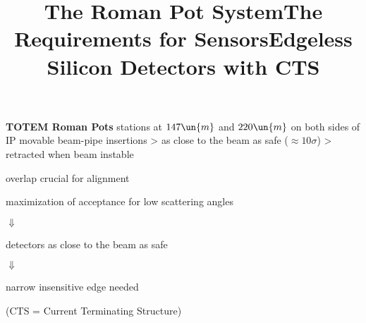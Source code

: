 \hbox{}\vfil

{\bf TOTEM Roman Pots}
\> stations at $147\un{m}$ and $220\un{m}$ on both sides of IP
\> movable beam-pipe insertions
\>> as close to the beam as safe ($\approx 10\sigma$)
\>> retracted when beam instable
\egroup

\vfil

\baselineskip
\centerline{}

\vfil
\vfil

\newpage %
\title{The Roman Pot System}


\bgroup
\parindent=0pt

\vskip2mm

\egroup

\> overlap crucial for alignment


\newpage %
\title{The Requirements for Sensors}

\centerline{}

\vfil

\centerline{maximization of acceptance for low scattering angles}
\centerline{$\Downarrow$}
\centerline{detectors as close to the beam as safe}
\centerline{$\Downarrow$}
\centerline{narrow insensitive edge needed}

\newpage %
\title{Edgeless Silicon Detectors with CTS}
\unskip
\centerline{(\SmallerFonts CTS = Current Terminating Structure)}


